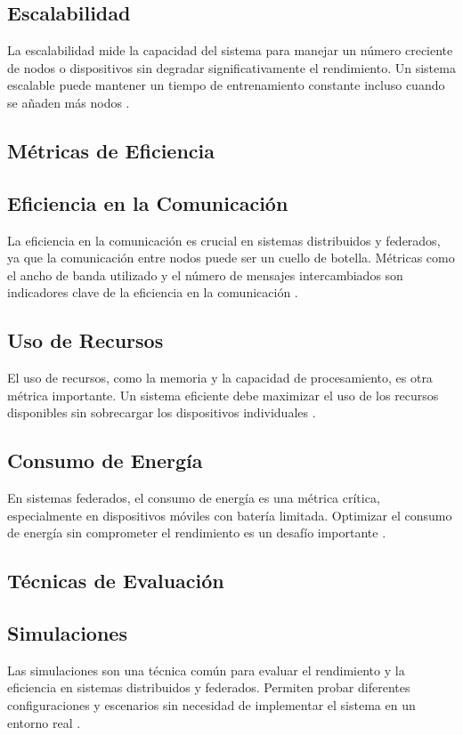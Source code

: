 \subsection{Escalabilidad}
La escalabilidad mide la capacidad del sistema para manejar un número creciente de nodos o dispositivos sin degradar significativamente el rendimiento. Un sistema escalable puede mantener un tiempo de entrenamiento constante incluso cuando se añaden más nodos \cite{konevcny2016federated}.

\subsection{Métricas de Eficiencia}
\subsection{Eficiencia en la Comunicación}
La eficiencia en la comunicación es crucial en sistemas distribuidos y federados, ya que la comunicación entre nodos puede ser un cuello de botella. Métricas como el ancho de banda utilizado y el número de mensajes intercambiados son indicadores clave de la eficiencia en la comunicación \cite{alistarh2017qsgd}.

\subsection{Uso de Recursos}
El uso de recursos, como la memoria y la capacidad de procesamiento, es otra métrica importante. Un sistema eficiente debe maximizar el uso de los recursos disponibles sin sobrecargar los dispositivos individuales \cite{bonawitz2019practical}.

\subsection{Consumo de Energía}
En sistemas federados, el consumo de energía es una métrica crítica, especialmente en dispositivos móviles con batería limitada. Optimizar el consumo de energía sin comprometer el rendimiento es un desafío importante \cite{yang2019federated}.

\subsection{Técnicas de Evaluación}
\subsection{Simulaciones}
Las simulaciones son una técnica común para evaluar el rendimiento y la eficiencia en sistemas distribuidos y federados. Permiten probar diferentes configuraciones y escenarios sin necesidad de implementar el sistema en un entorno real \cite{stich2018local}.

